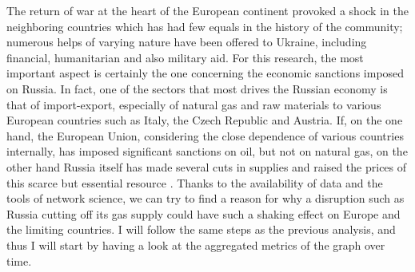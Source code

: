 The return of war at the heart of the European continent provoked a shock in the neighboring countries which has had few equals in the history of the community; numerous helps of varying nature have been offered to Ukraine, including financial, humanitarian and also military aid. For this research, the most important aspect is certainly the one concerning the economic sanctions imposed on Russia. In fact, one of the sectors that most drives the Russian economy is that of import-export, especially of natural gas and raw materials to various European countries such as Italy, the Czech Republic and Austria. If, on the one hand, the European Union, considering the close dependence of various countries internally, has imposed significant sanctions on oil, but not on natural gas, on the other hand Russia itself has made several cuts in supplies and raised the prices of this scarce but essential resource \cite{sole2022petrolio,wikipedia2022crisirussia}.
Thanks to the availability of data and the tools of network science, we can try to find a reason for why a disruption such as Russia cutting off its gas supply could have such a shaking effect on Europe and the limiting countries. I will follow the same steps as the previous analysis, and thus I will start by having a look at the aggregated metrics of the graph over time. 
